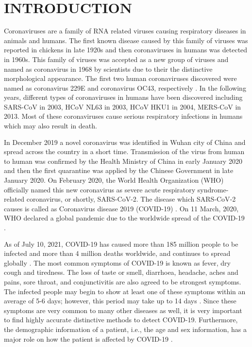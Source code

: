\chapter{INTRODUCTION}
\label{ch:CH1}

Coronaviruses are a family of RNA related viruses causing respiratory diseases in animals and humans. The first known disease caused by this family of viruses was reported in chickens in late 1920s and then coronaviruses in humans was detected in 1960s. This family of viruses was accepted as a new group of viruses and named as coronavirus in 1968 by scientists due to their the distinctive morphological appearance. The first two human coronaviruses discovered were named as coronavirus 229E and coronavirus OC43, respectively \cite{history_coronavirus}. In the following years, different types of coronaviruses in humans have been discovered including SARS-CoV in 2003, HCoV NL63 in 2003, HCoV HKU1 in 2004, MERS-CoV in 2013. Most of these coronaviruses cause serious respiratory infections in humans which may also result in death.


In December 2019 a novel coronavirus was identified in Wuhan city of China and spread across the country in a short time. Transmission of the virus from human to human was confirmed by the Health Ministry of China in early January 2020 and then the first quarantine was applied by the Chinese Government in late January 2020. On February 2020, the World Health Organization (WHO) officially named this new coronavirus as severe acute respiratory syndrome-related coronavirus, or shortly, SARS-CoV-2. The disease which SARS‑CoV‑2 causes is called as Coronavirus disease 2019 (COVID-19) \cite{coronavirus_species}. On 11 March, 2020,  WHO declared a global pandemic due to the worldwide spread of the COVID-19 \cite{who_pandemic_declaration}.

As of July 10, 2021, COVID-19 has caused more than 185 million people to be infected and more than 4 million deaths worldwide, and continues to spread globally \cite{covid19_news}. The most common symptoms of COVID-19 is known as fever, dry cough and tiredness. The loss of taste or smell, diarrhoea, headache, aches and pains, sore throat, and conjunctivitis are also agreed to be strongest symptoms. The infected people may begin to show at least one of these symptoms within an average of 5-6 days; however, this period may take up to 14 days \cite{who_qa}. Since these symptoms are very common to many other diseases as well, it is very important to find highly accurate distinctive methods to detect COVID-19. Furthermore, the demographic information of a patient, i.e., the age and sex information, has a major role on how the patient is affected by COVID-19 \cite{effect_of_demographicInfo}. 

